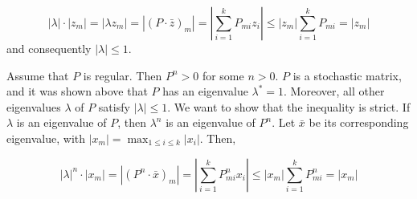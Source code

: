 \documentclass{tufte-handout}
\begin{document}
    
    \[
    |\lambda| \cdot |z_m| = |\lambda z_m| = |(P \cdot \bar{z})_m| = \left| \sum_{i=1}^{k} P_{mi} z_i 
    \right| \leq |z_m| \sum_{i=1}^{k} P_{mi} = |z_m|
    \]
    and consequently $|\lambda| \leq 1$.

    Assume that $P$ is regular. Then $P^n > 0$ for some $n > 0$. $P$ is a stochastic matrix, 
    and it was shown above that $P$ has an eigenvalue $\lambda^* = 1$. Moreover, all other 
    eigenvalues $\lambda$ of $P$ satisfy $|\lambda| \leq 1$. We want to show that the 
    inequality is strict. If $\lambda$ is an eigenvalue of $P$, then $\lambda^n$ is an 
    eigenvalue of $P^n$. Let $\bar{x}$ be its corresponding eigenvalue, with $|x_m| = 
    \max_{1 \leq i \leq k} |x_i|$. Then,

    \[
    |\lambda|^n \cdot |x_m| = |(P^n \cdot \bar{x})_m| = \left| \sum_{i=1}^{k} P^n_{mi} x_i \right| 
    \leq |x_m| \sum_{i=1}^{k} P^n_{mi} = |x_m|
    \]
\end{document}
